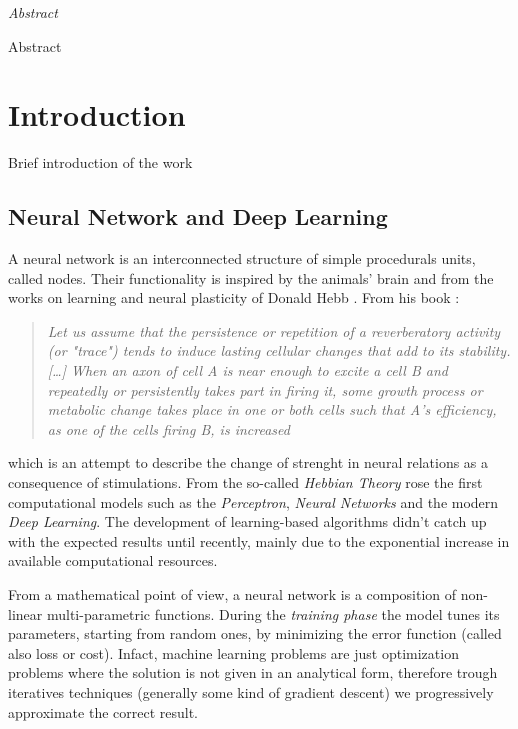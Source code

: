 \documentclass[12pt,a4paper]{report}
\begin{document}
\newpage

\vspace*{125px}
\LARGE\textit{Abstract}
\normalsize
\vspace{2mm}

Abstract

\newpage
\normalsize 

\tableofcontents

\chapter{Introduction}

Brief introduction of the work

\section{Neural Network and Deep Learning}

  A neural network is an interconnected structure of simple procedurals units, called nodes. Their functionality is inspired by the animals' brain and from the works on learning and neural plasticity of Donald Hebb \cite{hebb-learning}. From his book :

\begin{quote}
 \begin{center}
  \textit{Let us assume that the persistence or repetition of a reverberatory activity (or "trace") tends to induce lasting cellular changes that add to its stability.[…] When an axon of cell A is near enough to excite a cell B and repeatedly or persistently takes part in firing it, some growth process or metabolic change takes place in one or both cells such that A's efficiency, as one of the cells firing B, is increased}
 \end{center}
\end{quote}

which is an attempt to describe the change of strenght in neural relations as a consequence of stimulations.
From the so-called \textit{Hebbian Theory} rose the first computational models such as the \textit{Perceptron}, \textit{Neural Networks} and the modern \textit{Deep Learning}. 
The development of learning-based algorithms didn't catch up with the expected results until recently, mainly due to the exponential increase in available computational resources.

From a mathematical point of view, a neural network is a composition of non-linear multi-parametric functions. 
During the {\it training phase} the model tunes its parameters, starting from random ones, by minimizing the error function (called also loss or cost). 
Infact, machine learning problems are just optimization problems where the solution is not given in an analytical form, therefore trough iteratives techniques (generally some kind of gradient descent) we progressively approximate the correct result.
\end{document}
